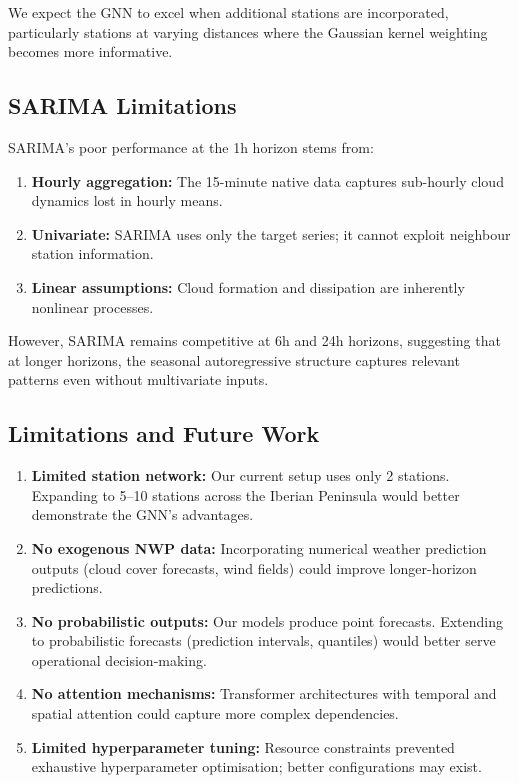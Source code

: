 \documentclass[11pt,a4paper]{article}
\begin{document}
We expect the GNN to excel when additional stations are incorporated, particularly stations at varying distances where the Gaussian kernel weighting becomes more informative.

\subsection{SARIMA Limitations}

SARIMA's poor performance at the 1h horizon stems from:
\begin{enumerate}[noitemsep]
    \item \textbf{Hourly aggregation:} The 15-minute native data captures sub-hourly cloud dynamics lost in hourly means.
    \item \textbf{Univariate:} SARIMA uses only the target series; it cannot exploit neighbour station information.
    \item \textbf{Linear assumptions:} Cloud formation and dissipation are inherently nonlinear processes.
\end{enumerate}

However, SARIMA remains competitive at 6h and 24h horizons, suggesting that at longer horizons, the seasonal autoregressive structure captures relevant patterns even without multivariate inputs.

\subsection{Limitations and Future Work}

\begin{enumerate}
    \item \textbf{Limited station network:} Our current setup uses only 2 stations. Expanding to 5--10 stations across the Iberian Peninsula would better demonstrate the GNN's advantages.
    
    \item \textbf{No exogenous NWP data:} Incorporating numerical weather prediction outputs (cloud cover forecasts, wind fields) could improve longer-horizon predictions.
    
    \item \textbf{No probabilistic outputs:} Our models produce point forecasts. Extending to probabilistic forecasts (prediction intervals, quantiles) would better serve operational decision-making.
    
    \item \textbf{No attention mechanisms:} Transformer architectures with temporal and spatial attention could capture more complex dependencies.
    
    \item \textbf{Limited hyperparameter tuning:} Resource constraints prevented exhaustive hyperparameter optimisation; better configurations may exist.
\end{enumerate}
\end{document}

